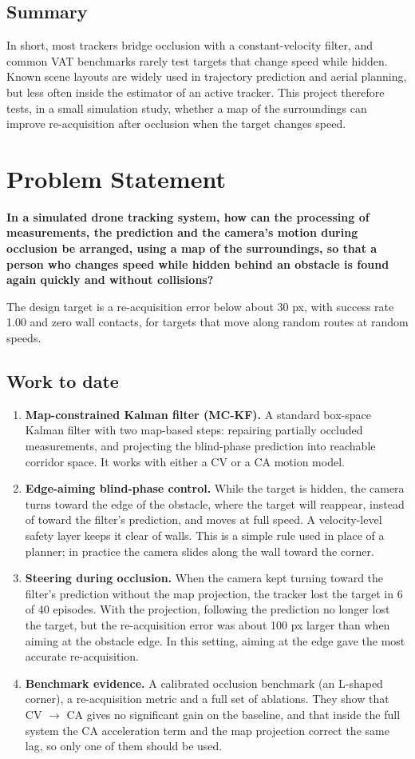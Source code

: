 \documentclass[12pt,a4paper]{article}
\begin{document}
\subsection{Summary}
In short, most trackers bridge occlusion with a constant-velocity filter, and common VAT benchmarks rarely test targets that change speed while hidden.
Known scene layouts are widely used in trajectory prediction and aerial planning, but less often inside the estimator of an active tracker.
This project therefore tests, in a small simulation study, whether a map of the surroundings can improve re-acquisition after occlusion when the target changes speed.

\section{Problem Statement}
\textbf{In a simulated drone tracking system, how can the processing of measurements, the prediction and the camera's motion during occlusion be arranged, using a map of the surroundings, so that a person who changes speed while hidden behind an obstacle is found again quickly and without collisions?}

The design target is a re-acquisition error below about 30 px, with success rate 1.00 and zero wall contacts, for targets that move along random routes at random speeds.

\subsection{Work to date}
\begin{enumerate}[label=\textbf{C\arabic*.}]
  \item \textbf{Map-constrained Kalman filter (MC-KF).} A standard box-space Kalman filter with two map-based steps: repairing partially occluded measurements, and projecting the blind-phase prediction into reachable corridor space. It works with either a CV or a CA motion model.
  \item \textbf{Edge-aiming blind-phase control.} While the target is hidden, the camera turns toward the edge of the obstacle, where the target will reappear, instead of toward the filter's prediction, and moves at full speed. A velocity-level safety layer keeps it clear of walls. This is a simple rule used in place of a planner; in practice the camera slides along the wall toward the corner.
  \item \textbf{Steering during occlusion.} When the camera kept turning toward the filter's prediction without the map projection, the tracker lost the target in 6 of 40 episodes. With the projection, following the prediction no longer lost the target, but the re-acquisition error was about 100 px larger than when aiming at the obstacle edge. In this setting, aiming at the edge gave the most accurate re-acquisition.
  \item \textbf{Benchmark evidence.} A calibrated occlusion benchmark (an L-shaped corner), a re-acquisition metric and a full set of ablations. They show that CV $\rightarrow$ CA gives no significant gain on the baseline, and that inside the full system the CA acceleration term and the map projection correct the same lag, so only one of them should be used.
\end{enumerate}
\end{document}
